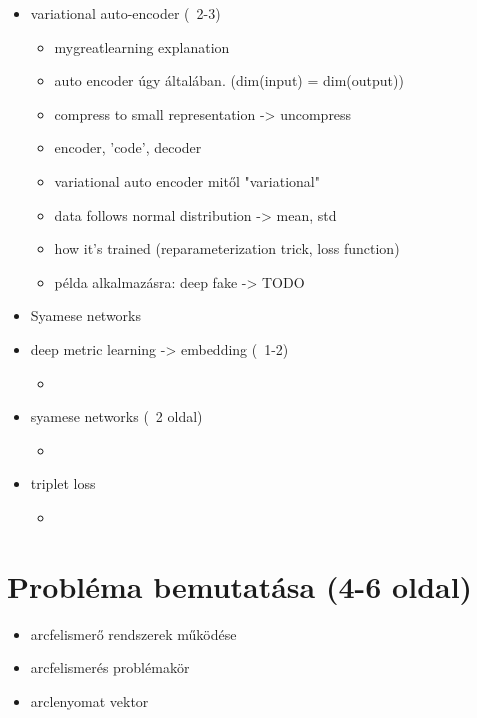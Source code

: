 \begin{itemize}
\begin{itemize}
	\end{itemize}
	\item variational auto-encoder (~2-3)
	\begin{itemize}
		\item mygreatlearning explanation
		\item auto encoder úgy általában. (dim(input) = dim(output))
		\item compress to small representation -> uncompress
		\item encoder, 'code', decoder
		\item variational auto encoder mitől "variational"
		\item data follows normal distribution -> mean, std
		\item how it's trained (reparameterization trick, loss function)
		\item példa alkalmazásra: deep fake -> TODO
	\end{itemize}
	\item Syamese networks

	\item deep metric learning -> embedding (~1-2)
	\begin{itemize}
		\item 
	\end{itemize}
	\item syamese networks (~2 oldal)
	\begin{itemize}
		\item 
	\end{itemize}
	\item triplet loss
	\begin{itemize}
		\item 
	\end{itemize}
\end{itemize}

\section{Probléma bemutatása (4-6 oldal)} 
\begin{itemize}
	\item arcfelismerő rendszerek működése
	\item arcfelismerés problémakör
	\item arclenyomat vektor
\end{itemize}


